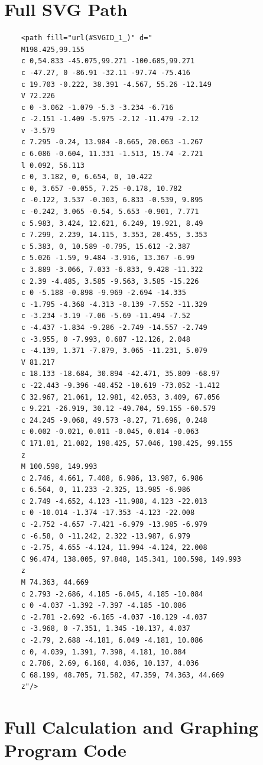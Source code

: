 \documentclass[letterpaper, 12pt]{article}
\begin{document}



\appendix

\section{Full SVG Path} \label{app:fullSVG}

\begin{verbatim}
    <path fill="url(#SVGID_1_)" d="
    M198.425,99.155
    c 0,54.833 -45.075,99.271 -100.685,99.271
    c -47.27, 0 -86.91 -32.11 -97.74 -75.416
    c 19.703 -0.222, 38.391 -4.567, 55.26 -12.149
    V 72.226
    c 0 -3.062 -1.079 -5.3 -3.234 -6.716
    c -2.151 -1.409 -5.975 -2.12 -11.479 -2.12
    v -3.579
    c 7.295 -0.24, 13.984 -0.665, 20.063 -1.267
    c 6.086 -0.604, 11.331 -1.513, 15.74 -2.721
    l 0.092, 56.113
    c 0, 3.182, 0, 6.654, 0, 10.422
    c 0, 3.657 -0.055, 7.25 -0.178, 10.782
    c -0.122, 3.537 -0.303, 6.833 -0.539, 9.895
    c -0.242, 3.065 -0.54, 5.653 -0.901, 7.771
    c 5.983, 3.424, 12.621, 6.249, 19.921, 8.49
    c 7.299, 2.239, 14.115, 3.353, 20.455, 3.353
    c 5.383, 0, 10.589 -0.795, 15.612 -2.387
    c 5.026 -1.59, 9.484 -3.916, 13.367 -6.99
    c 3.889 -3.066, 7.033 -6.833, 9.428 -11.322
    c 2.39 -4.485, 3.585 -9.563, 3.585 -15.226
    c 0 -5.188 -0.898 -9.969 -2.694 -14.335
    c -1.795 -4.368 -4.313 -8.139 -7.552 -11.329
    c -3.234 -3.19 -7.06 -5.69 -11.494 -7.52
    c -4.437 -1.834 -9.286 -2.749 -14.557 -2.749
    c -3.955, 0 -7.993, 0.687 -12.126, 2.048
    c -4.139, 1.371 -7.879, 3.065 -11.231, 5.079
    V 81.217
    c 18.133 -18.684, 30.894 -42.471, 35.809 -68.97
    c -22.443 -9.396 -48.452 -10.619 -73.052 -1.412
    C 32.967, 21.061, 12.981, 42.053, 3.409, 67.056
    c 9.221 -26.919, 30.12 -49.704, 59.155 -60.579
    c 24.245 -9.068, 49.573 -8.27, 71.696, 0.248
    c 0.002 -0.021, 0.011 -0.045, 0.014 -0.063
    C 171.81, 21.082, 198.425, 57.046, 198.425, 99.155
    z 
    M 100.598, 149.993
    c 2.746, 4.661, 7.408, 6.986, 13.987, 6.986
    c 6.564, 0, 11.233 -2.325, 13.985 -6.986
    c 2.749 -4.652, 4.123 -11.988, 4.123 -22.013
    c 0 -10.014 -1.374 -17.353 -4.123 -22.008
    c -2.752 -4.657 -7.421 -6.979 -13.985 -6.979
    c -6.58, 0 -11.242, 2.322 -13.987, 6.979
    c -2.75, 4.655 -4.124, 11.994 -4.124, 22.008
    C 96.474, 138.005, 97.848, 145.341, 100.598, 149.993
    z 
    M 74.363, 44.669
    c 2.793 -2.686, 4.185 -6.045, 4.185 -10.084
    c 0 -4.037 -1.392 -7.397 -4.185 -10.086
    c -2.781 -2.692 -6.165 -4.037 -10.129 -4.037
    c -3.968, 0 -7.351, 1.345 -10.137, 4.037
    c -2.79, 2.688 -4.181, 6.049 -4.181, 10.086
    c 0, 4.039, 1.391, 7.398, 4.181, 10.084
    c 2.786, 2.69, 6.168, 4.036, 10.137, 4.036
    C 68.199, 48.705, 71.582, 47.359, 74.363, 44.669
    z"/>
\end{verbatim}

\section{Full Calculation and Graphing Program Code}


\end{document}
